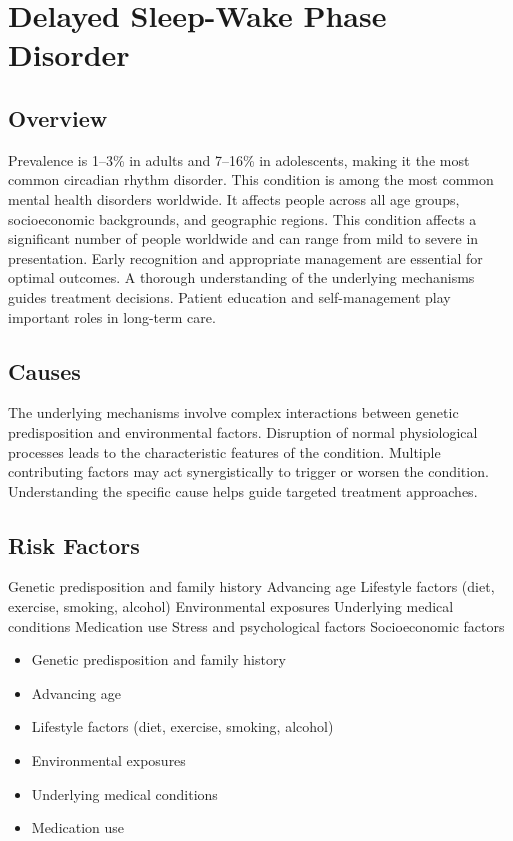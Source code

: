 \chapter{Delayed Sleep-Wake Phase Disorder}
\label{sec:Delayed Sleep-Wake Phase Disorder}

\section{Overview}
Prevalence is 1--3\% in adults and 7--16\% in adolescents, making it the most common circadian rhythm disorder. This condition is among the most common mental health disorders worldwide. It affects people across all age groups, socioeconomic backgrounds, and geographic regions. This condition affects a significant number of people worldwide and can range from mild to severe in presentation. Early recognition and appropriate management are essential for optimal outcomes. A thorough understanding of the underlying mechanisms guides treatment decisions. Patient education and self-management play important roles in long-term care.
\section{Causes}
The underlying mechanisms involve complex interactions between genetic predisposition and environmental factors. Disruption of normal physiological processes leads to the characteristic features of the condition. Multiple contributing factors may act synergistically to trigger or worsen the condition. Understanding the specific cause helps guide targeted treatment approaches.
\section{Risk Factors}
Genetic predisposition and family history Advancing age Lifestyle factors (diet, exercise, smoking, alcohol) Environmental exposures Underlying medical conditions Medication use Stress and psychological factors Socioeconomic factors

\begin{itemize}[noitemsep]
  \item Genetic predisposition and family history
  \item Advancing age
  \item Lifestyle factors (diet, exercise, smoking, alcohol)
  \item Environmental exposures
  \item Underlying medical conditions
  \item Medication use
\end{itemize}
